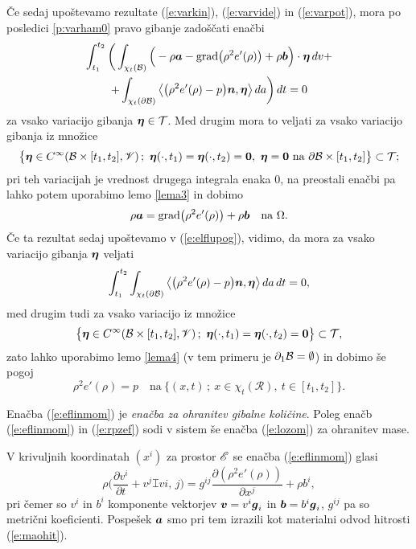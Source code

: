 Če sedaj upoštevamo rezultate (\ref{e:varkin}), (\ref{e:varvide}) in (\ref{e:varpot}),
mora po posledici \ref{p:varham0} pravo gibanje zadoščati enačbi
\begin{multline} \label{e:elflupog}
	\int_{t_1}^{t_2}\bigg( \int_{\chi_t(\mathcal B)}\Big(-\rho\boldsymbol a-
	\mathrm{grad}\big(\rho^2 e'(\rho)\big)+\rho\boldsymbol b\Big)\cdot\boldsymbol \eta\,dv+ \\
	+\int_{\chi_t(\partial \mathcal B)}\big<\big(\rho^2 e'(\rho)-p\big)\boldsymbol n,\boldsymbol \eta\big>\,da\bigg)\,dt=0
\end{multline}
za vsako variacijo gibanja $\boldsymbol \eta\in\mathcal{T}$. Med drugim mora to veljati za
vsako variacijo gibanja iz množice
\[
	\big\{ \vek{\eta}\in C^{\infty}(\B\times[t_1,t_2],\V)\,;\ \vek{\eta}(\cdot,t_1)=
	\vek{\eta}(\cdot,t_2)=\vek{0},\ \vek{\eta}=\vek{0}\ \textrm{na}\ \partial \B\times[t_1,t_2]
	\big\}\subset\mathcal{T};
\]
pri teh variacijah je vrednost drugega integrala enaka 0, na preostali enačbi
pa lahko potem uporabimo lemo \ref{lema3} in dobimo
\begin{equation} \label{e:eflinmom}
	\rho\boldsymbol a=\mathrm{grad}\big(\rho^2 e'(\rho)\big)+\rho\boldsymbol b\quad
	\textrm{na}\ \Omega.
\end{equation}
Če ta rezultat sedaj upoštevamo v (\ref{e:elflupog}), vidimo, da mora
za vsako variacijo gibanja $\boldsymbol \eta$ veljati
\[
	\int_{t_1}^{t_2}\int_{\chi_t(\partial \mathcal B)}\big<\big(\rho^2 e'(\rho)-p\big)\boldsymbol n,\boldsymbol \eta\big>\,da\,dt=0,
\]
med drugim tudi za vsako variacijo iz množice
\[
	\big\{ \vek{\eta}\in C^{\infty}(\B\times[t_1,t_2],\V)\,;\ \vek{\eta}(\cdot,t_1)=
	\vek{\eta}(\cdot,t_2)=\vek{0} \big\}\subset\mathcal{T},
\]
zato lahko uporabimo lemo \ref{lema4} (v tem primeru je $\partial_1\mathcal B=\emptyset$) in dobimo še pogoj
\begin{equation} \label{e:rpzef}
	\rho^2 e'(\rho)=p \quad\textrm{na}\ \{ (x,t)\,;\ x\in\chi_t(\mathcal{R}),\ t\in[t_1,t_2] \}.
\end{equation}

Enačba (\ref{e:eflinmom}) je \emph{enačba za ohranitev gibalne količine}.
Poleg enačb (\ref{e:eflinmom}) in (\ref{e:rpzef}) sodi v sistem še enačba (\ref{e:lozom})
za ohranitev mase.

V krivuljnih koordinatah $(x^i)$ za prostor $\mathscr E$ se enačba (\ref{e:eflinmom}) glasi
\[
	\rho\Big(\frac{\partial v^i}{\partial t}+v^j \topbot{v}{i}{,\, j}\Big)
	=g^{ij}\frac{\partial (\rho^2e'(\rho))}{\partial x^j}+\rho b^i,
\]
pri čemer so $v^i$ in $b^i$ komponente vektorjev $\boldsymbol v=v^i\boldsymbol g_i$ in $\boldsymbol b=b^i\boldsymbol g_i$,
$g^{ij}$ pa so metrični koeficienti.
Pospešek $\boldsymbol a$ smo pri tem izrazili kot materialni odvod hitrosti (\ref{e:maohit}).


